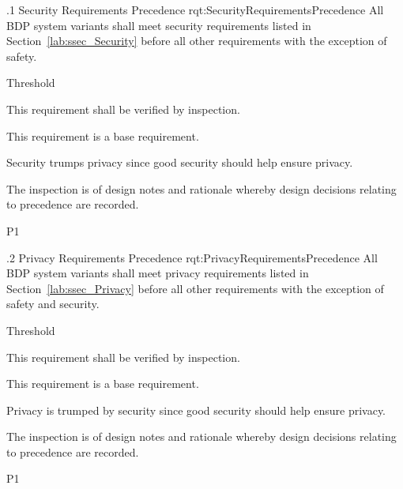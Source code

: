 \ONERQMTV
{\RqtNumberBase.1}
{Security Requirements Precedence}
{rqt:SecurityRequirementsPrecedence}
{All BDP system variants shall meet security requirements listed in Section~\ref{lab:ssec_Security} before all other requirements with the exception of safety.}
{
	\item [Phase 1] Threshold
}
{This requirement shall be verified by inspection.}
{
	\item [N/A] This requirement is a base requirement.
}
{
	\item Security trumps privacy since good security should help ensure privacy.
	\item The inspection is of design notes and rationale whereby design decisions relating to precedence are recorded.
}
{P1}

\ONERQMTV
{\RqtNumberBase.2}
{Privacy Requirements Precedence}
{rqt:PrivacyRequirementsPrecedence}
{All BDP system variants shall meet privacy requirements listed in Section~\ref{lab:ssec_Privacy} before all other requirements with the exception of safety and security.}
{
	\item [Phase 1] Threshold
}
{This requirement shall be verified by inspection.}
{
	\item [N/A] This requirement is a base requirement.
}
{
	\item Privacy is trumped by security since good security should help ensure privacy.
	\item The inspection is of design notes and rationale whereby design decisions relating to precedence are recorded.	
}
{P1}
